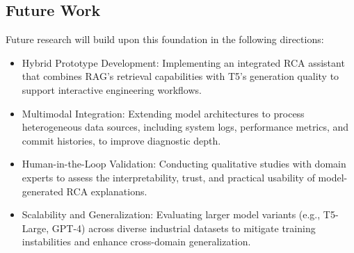 \documentclass[10pt,twocolumn,journal]{IEEEtran}
\begin{document}
\subsection{Future Work}
Future research will build upon this foundation in the following directions:
\begin{itemize}
    \item Hybrid Prototype Development: Implementing an integrated RCA assistant that combines RAG's retrieval capabilities with T5's generation quality to support interactive engineering workflows.
    \item Multimodal Integration: Extending model architectures to process heterogeneous data sources, including system logs, performance metrics, and commit histories, to improve diagnostic depth.
    \item Human-in-the-Loop Validation: Conducting qualitative studies with domain experts to assess the interpretability, trust, and practical usability of model-generated RCA explanations.
    \item Scalability and Generalization: Evaluating larger model variants (e.g., T5-Large, GPT-4) across diverse industrial datasets to mitigate training instabilities and enhance cross-domain generalization.
\end{itemize}
\printbibliography
\end{document}
